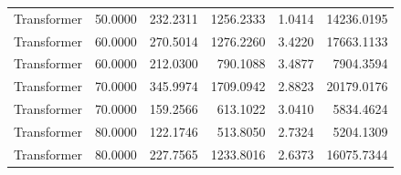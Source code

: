 \begin{tabular}{lrrrrr}
Transformer & 50.0000 & 232.2311 & 1256.2333 & 1.0414 & 14236.0195 \\
Transformer & 60.0000 & 270.5014 & 1276.2260 & 3.4220 & 17663.1133 \\
Transformer & 60.0000 & 212.0300 & 790.1088 & 3.4877 & 7904.3594 \\
Transformer & 70.0000 & 345.9974 & 1709.0942 & 2.8823 & 20179.0176 \\
Transformer & 70.0000 & 159.2566 & 613.1022 & 3.0410 & 5834.4624 \\
Transformer & 80.0000 & 122.1746 & 513.8050 & 2.7324 & 5204.1309 \\
Transformer & 80.0000 & 227.7565 & 1233.8016 & 2.6373 & 16075.7344 \\
\bottomrule
\end{tabular}
